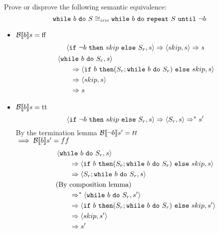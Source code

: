 \begin{exercise}{
    Prove or disprove the following semantic equivalence:
    \[ \texttt{while}\ b\ \texttt{do}\ S \cong_{\text{\tiny SOS}} \texttt{while}\ b\ \texttt{do}\ \texttt{repeat}\ S\ \texttt{until}\ \neg b  \]\vspace*{-0.6cm}
}
\begin{itemize}
            \begin{itemize}
                \item $\mathcal{B} \llbracket  b \rrbracket s = \text{ff}$
                \begin{gather*}
                    \instr{\texttt{if}\ \neg b\ \texttt{then}\ skip\ \texttt{else}\ S_r}{s}
                    \Rightarrow
                    \instr{skip}{s}
                    \Rightarrow s
                    \\
                    \begin{align*}
                        &\instr{\wwhile{b}{S}_r}{s}
                        \\&\qquad\Rightarrow \instr{\texttt{if}\ b\ \texttt{then} (S_r; \wwhile{b}{S}_r)\ \texttt{else}\ skip}{s}
                        \\&\qquad\Rightarrow \instr{skip}{s}
                        \\&\qquad\Rightarrow s
                    \end{align*}
                \end{gather*}
                \item $\mathcal{B} \llbracket  b \rrbracket s = \text{tt}$
                \[
                    \instr{\texttt{if}\ \neg b\ \texttt{then}\ skip\ \texttt{else}\ S_r}{s}
                    \Rightarrow
                    \instr{S_r}{s}
                    \Rightarrow^* s'
                \]
                By the termination lemma $\mathcal{B} \llbracket  \neg b \rrbracket s' = tt$ \\
                $\implies \mathcal{B} \llbracket  b \rrbracket s' = ff$
                \begin{align*}
                    &\instr{\wwhile{b}{S}_r}{s}
                    \\&\qquad\Rightarrow \instr{\texttt{if}\ b\ \texttt{then} (S_r; \wwhile{b}{S}_r)\ \texttt{else}\ skip}{s}
                    \\&\qquad\Rightarrow \instr{S_r; \wwhile{b}{S}_r}{s}
                    \\&\text{(By composition lemma)}
                    \\&\qquad\Rightarrow^* \instr{\wwhile{b}{S}_r}{s'}
                    \\&\qquad\Rightarrow \instr{\texttt{if}\ b\ \texttt{then} (S_r; \wwhile{b}{S}_r)\ \texttt{else}\ skip}{s'}
                    \\&\qquad\Rightarrow \instr{skip}{s'}
                    \\&\qquad\Rightarrow s'
                \end{align*}

\end{itemize}
\end{itemize}
\end{exercise}
